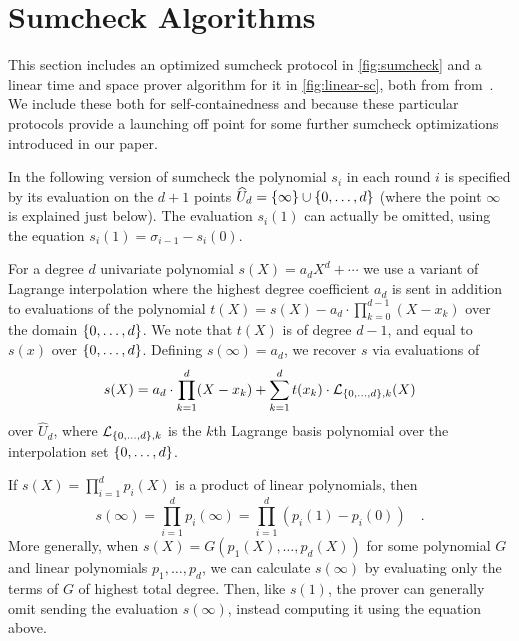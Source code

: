 \chapter{Sumcheck Algorithms}
\label{app:sumcheck}

This section includes an optimized sumcheck protocol in \cref{fig:sumcheck} and a linear time and space prover algorithm for it in \cref{fig:linear-sc}, both from from~\cite{BagadDaoDombThaler25}. We include these both for self-containedness and because these particular protocols provide a launching off point for some further sumcheck optimizations introduced in our paper.


In the following version of sumcheck the polynomial $s_i$ in each round $i$ is specified by its evaluation on the $d+1$ points $\widehat{U}_d = \set{\infty} \cup \set{0,\dotsc,d}$ (where the point $\infty$ is explained just below). The evaluation $s_i(1)$ can actually be omitted, using the equation $s_i(1) = \sigma_{i-1} - s_i(0)$.

For a degree $d$ univariate polynomial $s(X) = a_d X^d + \dotsm$ we use a variant of Lagrange interpolation where the highest degree coefficient $a_d$ is sent in addition to evaluations of the polynomial $t(X) = s(X) - a_d \cdot \prod_{k=0}^{d-1} (X - x_k)$ over the domain $\set{0,\dotsc,d}$. We note that $t(X)$ is of degree $d-1$, and equal to $s(x)$ over $\set{0,\dotsc,d}$. Defining $s(\infty) = a_d$, we recover $s$ via evaluations of
\[
s(X) = a_d \cdot \prod_{k=1}^d (X - x_k) + \sum_{k=1}^d t(x_k) \cdot \mathcal{L}_{\set{0,\dotsc,d},k}(X)
\]
over $\widehat{U}_d$, where $\mathcal{L}_{\set{0,\dotsc,d},k}$ is the $k$th Lagrange basis polynomial over the interpolation set $\set{0,\dotsc,d}$.

If $s(X) = \prod_{i=1}^d p_i(X)$ is a product of linear polynomials, then
\[
s(\infty) = \prod_{i=1}^d p_i(\infty) = \prod_{i=1}^d (p_i(1) - p_i(0)) \quad.
\]
More generally, when $s(X) = G(p_1(X), \ldots, p_d(X))$ for some polynomial $G$ and linear polynomials $p_1, \ldots, p_d$, we can calculate $s(\infty)$ by evaluating only the terms of $G$ of highest total degree. Then, like $s(1)$, the prover can generally omit sending the evaluation $s(\infty)$, instead computing it using the equation above.

